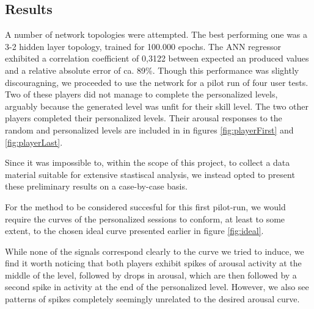 \documentclass{llncs}
\begin{document}
\subsection{Results}
A number of network topologies were attempted. The best performing one was a 3-2 hidden layer topology, trained for 100.000 epochs. The ANN regressor exhibited a correlation coefficient of 0,3122 between expected an produced values and a relative absolute error of ca. 89\%. Though this performance was slightly discouragning, we proceeded to use the network for a pilot run of four user tests.
Two of these players did not manage to complete the personalized levels, arguably because the generated level was unfit for their skill level.
The two other players completed their personalized levels. Their arousal responses to the random and personalized levels are included in in figures \ref{fig:playerFirst} and \ref{fig:playerLast}.

Since it was impossible to, within the scope of this project, to collect a data material suitable for extensive stastiscal analysis, we instead opted to present these preliminary results on a case-by-case basis.

For the method to be considered succesful for this first pilot-run, we would require the curves of the personalized sessions to conform, at least to some extent, to the chosen ideal curve presented earlier in figure \ref{fig:ideal}.

While none of the signals correspond clearly to the curve we tried to induce, we find it worth noticing that both players exhibit spikes of arousal activity at the middle of the level, followed by drops in arousal, which are then followed by a second spike in activity at the end of the personalized level. However, we also see patterns of spikes completely seemingly unrelated to the desired arousal curve.
\end{document}
